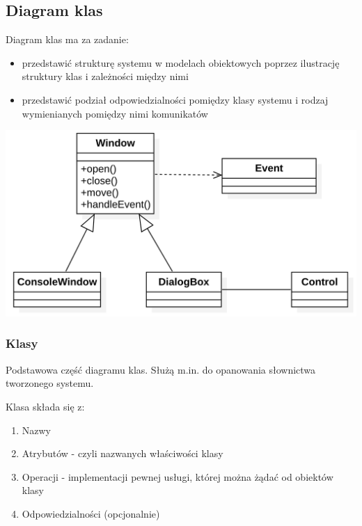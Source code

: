 \documentclass[12pt]{article}
\begin{document}
        \subsection{Diagram klas}
            
            Diagram klas ma za zadanie:
            \begin{itemize}
                \item przedstawić strukturę systemu w modelach obiektowych poprzez
                    ilustrację struktury klas i zależności między nimi
                \item przedstawić podział odpowiedzialności pomiędzy klasy systemu
                    i rodzaj wymienianych pomiędzy nimi komunikatów
            \end{itemize}

            \begin{center}
                \includegraphics[scale=0.40]{ooad/uml.png}
            \end{center}


            \subsubsection{Klasy}
                
                Podstawowa część diagramu klas. Służą m.in. do opanowania słownictwa
                tworzonego systemu.

                Klasa składa się z:
                \begin{enumerate}
                    \item Nazwy
                    \item Atrybutów - czyli nazwanych właściwości klasy
                    \item Operacji - implementacji pewnej usługi, której można żądać
                        od obiektów klasy
                    \item Odpowiedzialności (opcjonalnie)
                \end{enumerate}
\end{document}
